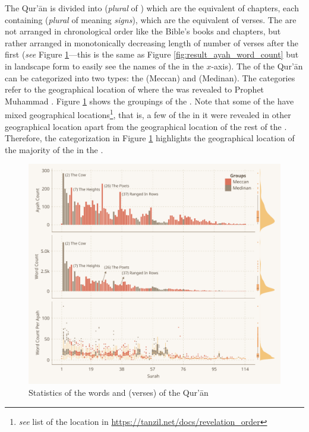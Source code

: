 The Qur'\=an is divided into   (\textit{plural} of  ) which are the equivalent of chapters, each containing   (\textit{plural} of   meaning \textit{signs}), which are the equivalent of verses. The   are not arranged in chronological order like the Bible's books and chapters, but rather arranged in monotonically decreasing length of number of verses after the first   (\textit{see} Figure \ref{fig:ayah_word_count}---this is the same as Figure \ref{fig:result_ayah_word_count} but in landscape form to easily see the names of the   in the $x$-axis). The   of the Qur'\=an can be categorized into two types: the   (Meccan) and   (Medinan). The categories refer to the geographical location of where the   was revealed to Prophet Muhammad . Figure \ref{fig:ayah_word_count} shows the groupings of the  . Note that some of the  \newline have mixed geographical locations\footnote{\textit{see} list of the location in \url{https://tanzil.net/docs/revelation_order}}, that is, a few of the   in it were revealed in other geographical location apart from the geographical location of the rest of the  . Therefore, the categorization in Figure \ref{fig:ayah_word_count} highlights the geographical location of the majority of the   in the  .

\begin{figure}[!b]
    \centering
    \includegraphics[width=\textwidth]{img/plot1.pdf}
    \caption{Statistics of the words and   (verses) of the Qur'\=an}
    \label{fig:ayah_word_count}
\end{figure}

